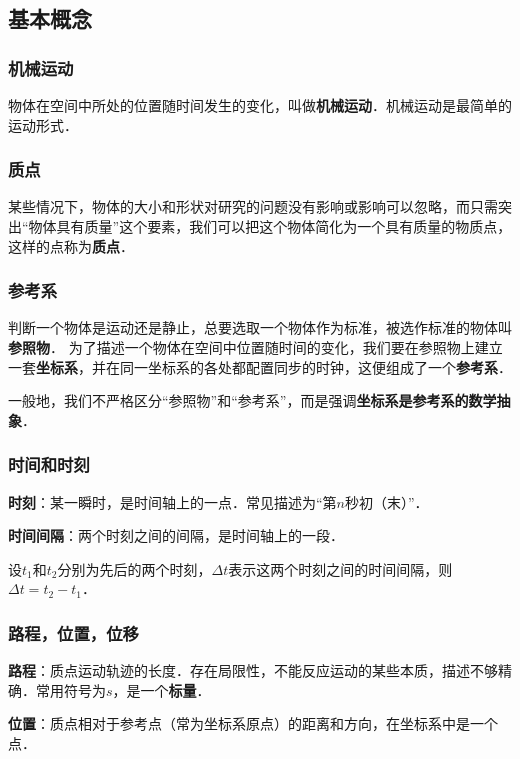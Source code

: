 

\subsection{基本概念}
\subsubsection{机械运动}
物体在空间中所处的位置随时间发生的变化，叫做\textbf{机械运动}．机械运动是最简单的运动形式．

\subsubsection{质点}
某些情况下，物体的大小和形状对研究的问题没有影响或影响可以忽略，而只需突出“物体具有质量”这个要素，我们可以把这个物体简化为一个具有质量的物质点，这样的点称为\textbf{质点}．

\subsubsection{参考系}
判断一个物体是运动还是静止，总要选取一个物体作为标准，被选作标准的物体叫\textbf{参照物}．
为了描述一个物体在空间中位置随时间的变化，我们要在参照物上建立一套\textbf{坐标系}，并在同一坐标系的各处都配置同步的时钟，这便组成了一个\textbf{参考系}．

一般地，我们不严格区分“参照物”和“参考系”，而是强调\textbf{坐标系是参考系的数学抽象}．

\subsubsection{时间和时刻}
\textbf{时刻}：某一瞬时，是时间轴上的一点．常见描述为“第$n$秒初（末）”．

\textbf{时间间隔}：两个时刻之间的间隔，是时间轴上的一段．

设$t_1$和$t_2$分别为先后的两个时刻，$\Delta t$表示这两个时刻之间的时间间隔，则$\Delta t = t_2 - t_1$．

\subsubsection{路程，位置，位移}
\textbf{路程}：质点运动轨迹的长度．存在局限性，不能反应运动的某些本质，描述不够精确．常用符号为$s$，是一个\textbf{标量}．

\textbf{位置}：质点相对于参考点（常为坐标系原点）的距离和方向，在坐标系中是一个点．

